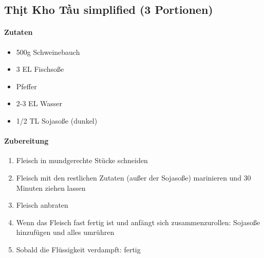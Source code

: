 \newpage
{}
\subsection{Thịt Kho Tầu simplified (3 Portionen)}
\paragraph{Zutaten}
\begin{itemize}[noitemsep]
	\item 500g Schweinebauch
	\item 3 EL Fischsoße
	\item Pfeffer 
	\item 2-3 EL Wasser 
	\item 1/2 TL Sojasoße (dunkel)
\end{itemize}
\paragraph{Zubereitung}
\begin{enumerate}[noitemsep]
	\item Fleisch in mundgerechte Stücke schneiden
	\item Fleisch mit den restlichen Zutaten (außer der Sojasoße) marinieren und 30 Minuten ziehen lassen
	\item Fleisch anbraten
	\item Wenn das Fleisch fast fertig ist und anfängt sich zusammenzurollen: Sojasoße hinzufügen und alles umrühren
	\item Sobald die Flüssigkeit verdampft: fertig
\end{enumerate}
